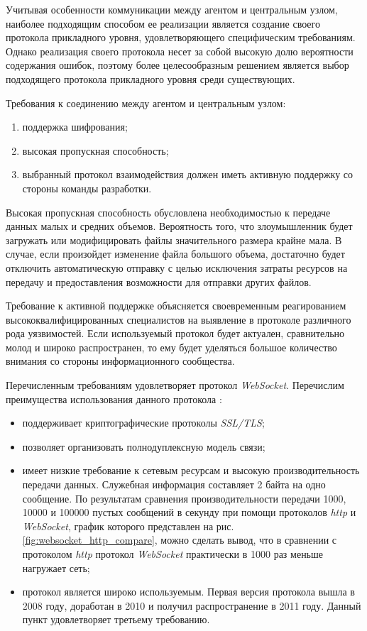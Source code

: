 Учитывая особенности коммуникации между агентом и центральным узлом, наиболее подходящим способом ее реализации является создание своего протокола прикладного уровня, удовлетворяющего специфическим требованиям. Однако реализация своего протокола несет за собой высокую долю вероятности содержания ошибок, поэтому более целесообразным  решением является выбор подходящего протокола прикладного уровня среди существующих.

Требования к соединению между агентом и центральным узлом:
\begin{enumerate}
\item поддержка шифрования;
\item высокая пропускная способность;
\item выбранный протокол взаимодействия должен иметь активную поддержку со стороны команды разработки.
\end{enumerate}

Высокая пропускная способность обусловлена необходимостью к передаче данных малых и средних объемов. Вероятность того, что злоумышленник будет загружать или модифицировать файлы значительного размера крайне мала. В случае, если произойдет изменение файла большого объема, достаточно будет отключить автоматическую отправку с целью исключения затраты ресурсов на передачу и предоставления возможности для отправки других файлов.

Требование к активной поддержке объясняется своевременным реагированием высококвалифицированных специалистов на выявление в протоколе различного рода уязвимостей. Если используемый протокол будет актуален, сравнительно молод и широко распространен, то ему будет уделяться большое количество внимания со стороны информационного сообщества.

Перечисленным требованиям удовлетворяет протокол \textit{WebSocket}. Перечислим преимущества использования данного протокола \citep{Fedorenkov2015WebSocket}:
\begin{itemize}
\item поддерживает криптографические протоколы \textit{SSL/TLS};
\item позволяет организовать полнодуплексную модель связи;
\item имеет низкие требование к сетевым ресурсам и высокую производительность передачи данных. Служебная информация составляет 2 байта на одно сообщение. По результатам сравнения\citep{Fedorenkov2015WebSocket} производительности передачи 1000, 10000 и 100000 пустых сообщений в секунду при помощи протоколов \textit{http} и \textit{WebSocket}, график которого представлен на рис. \ref{fig:websocket_http_compare}, можно сделать вывод, что в сравнении с протоколом \textit{http} протокол \textit{WebSocket} практически в 1000 раз меньше нагружает сеть;
\item протокол является широко используемым. Первая версия протокола вышла в 2008 году, доработан в 2010 и получил распространение в 2011 году. Данный пункт удовлетворяет третьему требованию.
\end{itemize}

